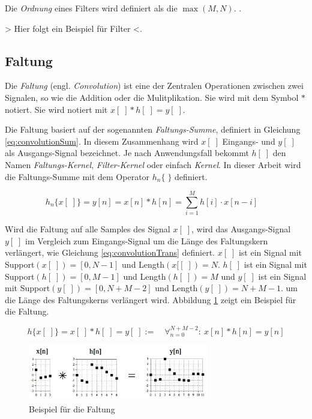 Die \emph{Ordnung} eines Filters wird definiert als die $\max(M,N)$. \cite[\glqq Filter Order\grqq]{introductionToFilters}.

> Hier folgt ein Beispiel für Filter <.

\subsection{Faltung}
\label{sec:convolution}

Die \emph{Faltung} (engl. \emph{Convolution}) ist eine der Zentralen Operationen zwischen zwei Signalen, so wie die Addition oder die Mulitplikation. Sie wird mit dem Symbol $*$ notiert. Sie wird notiert mit $x[\;]* h[\;] = y[\;]$. 

Die Faltung basiert auf der sogenannten \emph{Faltungs-Summe}, definiert in Gleichung \ref{eq:convolutionSum}. In diesem Zusammenhang wird $x[\;]$ Eingangs- und $y[\;]$ als Ausgangs-Signal bezeichnet. Je nach Anwendungsfall bekommt $h[\;]$ den Namen \emph{Faltungs-Kernel}, \emph{Filter-Kernel} oder einfach \emph{Kernel}. In dieser Arbeit wird die Faltungs-Summe mit dem Operator $h_n\{\;\}$ definiert. \cite[S. 107-108]{dspGuide}

\begin{equation}
h_n\{x[\;]\} = y[n] = x[n] * h[n] = \sum_{i=1}^{M} h[i] \cdot x[n-i] \quad
\label{eq:convolutionSum}
\end{equation}

Wird die Faltung auf alle Samples des Signal $x[\;]$, wird das Ausgangs-Signal $y[\;]$ im Vergleich zum Eingangs-Signal um die Länge des Faltungskern verlängert, wie Gleichung \ref{eq:convolutionTrans} definiert. $x[\;]$ ist ein Signal mit Support$(x[\;]) = [0,N-1]$ und Length$(x[[\;]) = N$. $h[\;]$ ist ein Signal mit Support$(h[\;]) = [0,M-1]$ und Length$(h[\;]) = M$ und $y[\;]$ ist ein Signal mit Support$(y[\;]) = [0,N+M-2]$ und Length$(y[\;]) = N+M-1$.  um die Länge des Faltungskerns verlängert wird. Abbildung 	\ref{img:convolutionExample} zeigt ein Beispiel für die Faltung.\cite[S. 115-120]{dspGuide}

\begin{equation}
h\{x[\;]\} = x[\;] *  h[\;] =  y[\;] := \quad \mathop{\forall}_{n = 0}^{N+M-2} :\ x[n] * h[n] = y[n]
\label{eq:convolutionTrans}
\end{equation}

\begin{figure}[h]
	\centering
	\includegraphics[width=0.7\textwidth]{bilder/convolutionExample.png}
	\caption{Beispiel für die Faltung \cite[S. 112]{dspGuide}}
	\label{img:convolutionExample}
\end{figure}

